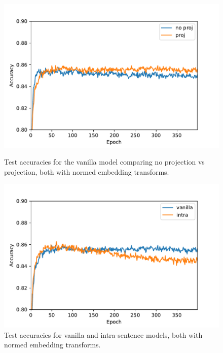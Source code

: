 \documentclass{article}
\begin{document}
\begin{figure}
\centering
\begin{minipage}[t]{.49\textwidth}
    \centering
    \includegraphics[scale=0.5]{fig/test_no_proj_vs_proj.pdf}
    \caption{Test accuracies for the vanilla model comparing no projection vs projection, both with normed embedding transforms.}
    \label{fig:test_no_proj_vs_proj}
\end{minipage}%
\hfill
\begin{minipage}[t]{.49\textwidth}
    \centering
    \includegraphics[scale=0.5]{fig/test_vanilla_vs_intra.pdf}
    \caption{Test accuracies for vanilla and intra-sentence models, both with normed embedding transforms.}
    \label{fig:test_vanilla_vs_intra}
\end{minipage}
\end{figure}
\end{document}
